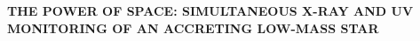 \documentclass[letterpaper,11pt,twocolumn]{article}
\begin{document}
%


\pagestyle{plain}


 

\begin{center} 
\bfseries\uppercase{%
The power of space: Simultaneous X-ray and UV monitoring of an accreting
low-mass star
}
\end{center}
\end{document}
